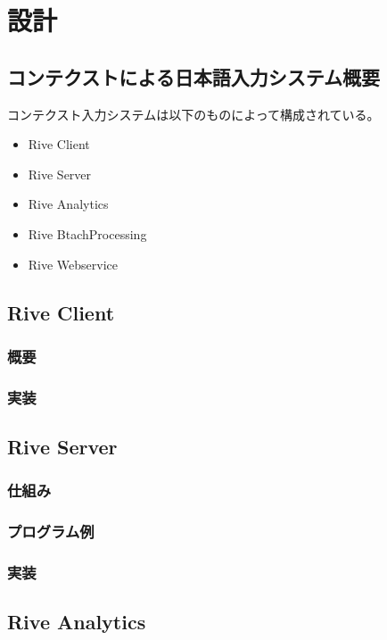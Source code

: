 \chapter{設計}
\label{chap:design}

\section{コンテクストによる日本語入力システム概要}

コンテクスト入力システムは以下のものによって構成されている。

\begin{itemize}
  \item Rive Client
  \item Rive Server
  \item Rive Analytics
  \item Rive BtachProcessing
  \item Rive Webservice
\end{itemize}


\section{Rive Client}
\subsection{概要}
\subsection{実装}

\section{Rive Server}
\subsection{仕組み}
\subsection{プログラム例}
\subsection{実装}

\section{Rive Analytics}
